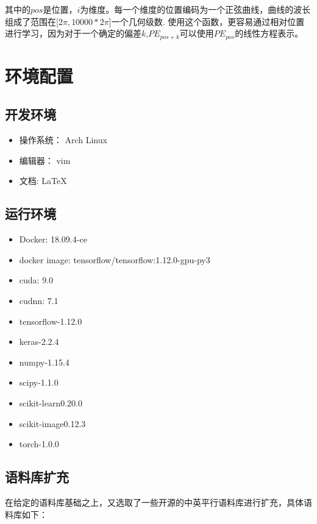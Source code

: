 \documentclass[UTF8,a4paper,10pt]{ctexart}
\begin{document}
其中的$pos$是位置，$i$为维度。每一个维度的位置编码为一个正弦曲线，曲线的波长组成了范围在[2$\pi,10000*2\pi$]一个几何级数.
使用这个函数，更容易通过相对位置进行学习，因为对于一个确定的偏差$k$,$PE_{pos+k}$可以使用$PE_{pos}$的线性方程表示。

\section{环境配置}

\subsection{开发环境}
\begin{itemize}
  \item 操作系统： Arch Linux
  \item 编辑器：   vim
  \item 文档:     \LaTeX
\end{itemize}

\subsection{运行环境}

\begin{itemize}
  \item Docker: 18.09.4-ce
  \item docker image: tensorflow/tensorflow:1.12.0-gpu-py3
  \item cuda: 9.0
  \item cudnn: 7.1
  \item tensorflow-1.12.0
  \item keras-2.2.4
  \item numpy-1.15.4
  \item scipy-1.1.0
  \item scikit-learn0.20.0
  \item scikit-image0.12.3
  \item torch-1.0.0
\end{itemize}

\subsection{语料库扩充}

在给定的语料库基础之上，又选取了一些开源的中英平行语料库进行扩充，具体语料库如下：
\end{document}
